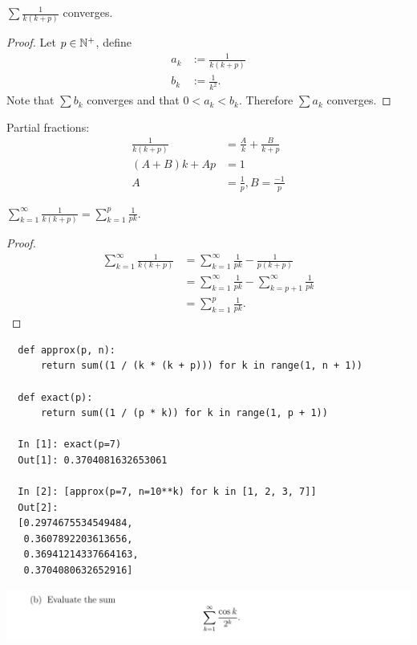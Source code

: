 \documentclass[12pt]{article}
\begin{document}
\begin{claim*}
  $\sum \frac{1}{k(k+p)}$ converges.
\end{claim*}

\begin{proof}
  Let $p \in \mathbb{N}^+$, define
  \begin{align*}
    a_k &:= \frac{1}{k(k + p)}\\
    b_k &:= \frac{1}{k^2}.
  \end{align*}
  Note that $\sum b_k$ converges and that $0 < a_k < b_k$. Therefore $\sum a_k$ converges.
\end{proof}

\begin{mdframed}
  Partial fractions:
\begin{align*}
  \frac{1}{k(k+p)} &= \frac{A}{k} + \frac{B}{k + p}\\
  (A + B)k + Ap &= 1\\
  A &= \frac{1}{p}, B = \frac{-1}{p}
\end{align*}
\end{mdframed}

\begin{claim*}
  $\sum_{k=1}^\infty \frac{1}{k(k+p)} = \sum_{k=1}^p\frac{1}{pk}$.
\end{claim*}
\begin{proof}
  \begin{align*}
    \sum_{k=1}^\infty \frac{1}{k(k+p)} &= \sum_{k=1}^\infty \frac{1}{pk} - \frac{1}{p(k + p)}\\
                                       &= \sum_{k=1}^\infty \frac{1}{pk} - \sum_{k=p+1}^\infty  \frac{1}{pk}\\
                                       &= \sum_{k=1}^p\frac{1}{pk}.
  \end{align*}
\end{proof}

\begin{verbatim}
  def approx(p, n):
      return sum((1 / (k * (k + p))) for k in range(1, n + 1))

  def exact(p):
      return sum((1 / (p * k)) for k in range(1, p + 1))

  In [1]: exact(p=7)
  Out[1]: 0.3704081632653061

  In [2]: [approx(p=7, n=10**k) for k in [1, 2, 3, 7]]
  Out[2]:
  [0.2974675534549484,
   0.3607892203613656,
   0.36941214337664163,
   0.3704080632652916]
\end{verbatim}

\begin{mdframed}
\includegraphics[width=400pt]{img/analysis--oxford-M2-I-5-2-b.png}
\end{mdframed}
\end{document}
